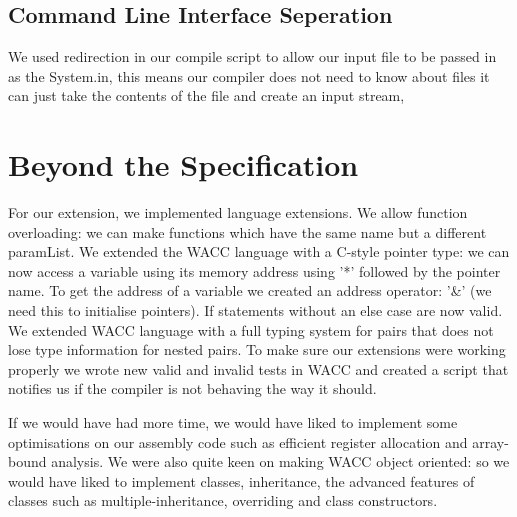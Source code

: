 \documentclass[11pt,a4paper]{article}
\begin{document}
\subsection{Command Line Interface Seperation}
\label{sub:Command Line Interface Seperation}
We used redirection in our compile script to allow our input file to be passed in as the System.in, this means our compiler does not need to know about files it can just take the contents of the file and create an input stream,

\section{Beyond the Specification}
\label{sec:Beyond the Specification}
For our extension, we implemented language extensions. We allow function overloading: we can make functions which have the same name but a different paramList. We extended the WACC language with a C-style pointer type: we can now access a variable using its memory address using '*' followed by the pointer name. To get the address of a variable we created an address operator: '&' (we need this to initialise pointers). If statements without an else case are now valid. We extended WACC language with a full typing system for pairs that does not lose type information for nested pairs.
To make sure our extensions were working properly we wrote new valid and invalid tests in WACC and created a script that notifies us if the compiler is not behaving the way it should.

If we would have had more time, we would have liked to implement some optimisations on our assembly code such as efficient register allocation and array-bound analysis. We were also quite keen on making WACC object oriented: so we would have liked to implement classes, inheritance, the advanced features of classes such as multiple-inheritance, overriding and class constructors.
\end{document}
